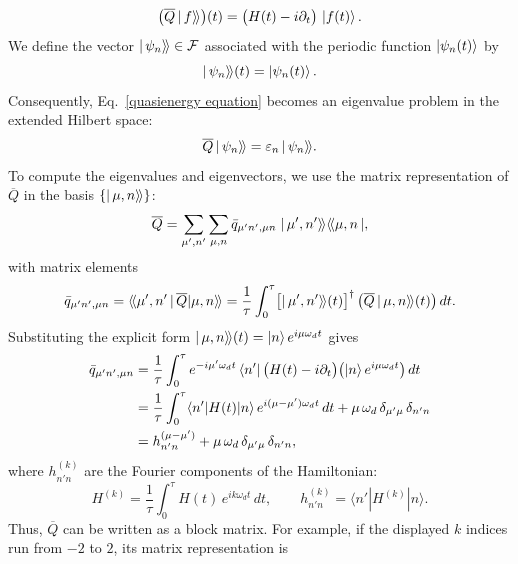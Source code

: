\begin{appendices}
\begin{equation}
    \bigl(\overline{Q}\,|\,f\rangle\!\rangle\bigr)(t) = \bigl(H(t)-i\partial_{t}\bigr)\,\ket{f(t)}.
\end{equation}
We define the vector $|\,\psi_n\rangle\!\rangle \in \mathcal{F}$ associated with the periodic function $\ket{\psi_n(t)}$ by
\begin{equation}
    \label{eigenvector definition}
    |\,\psi_n\rangle\!\rangle(t) = \ket{\psi_n(t)}.
\end{equation}
Consequently, Eq.~\eqref{quasienergy equation} becomes an eigenvalue problem in the extended Hilbert space:
\begin{equation}
    \label{evals equation}
    \overline{Q}\,|\,\psi_n\rangle\!\rangle = \varepsilon_n\,|\,\psi_n\rangle\!\rangle.
\end{equation}
To compute the eigenvalues and eigenvectors, we use the matrix representation of $\overline{Q}$ in the basis $\{|\,\mu,n\rangle\!\rangle\}$:
\begin{equation}
    \overline{Q} = \sum_{\mu',n'}\sum_{\mu,n} \bar{q}_{\mu' n',\mu n}\;|\,\mu',n'\rangle\!\rangle\langle\!\langle\mu,n\,|,
\end{equation}
with matrix elements
\begin{align}
    \bar{q}_{\mu' n',\mu n}
    = \langle\!\langle\mu',n'\,|\,\overline{Q}|\mu,n\rangle\!\rangle \nonumber= \frac{1}{\tau}\int_{0}^{\tau} \bigl[|\,\mu',n'\rangle\!\rangle(t)\bigr]^\dagger\, \bigl(\overline{Q}\,|\,\mu,n\rangle\!\rangle(t)\bigr)\,dt.
\end{align}
Substituting the explicit form $|\,\mu,n\rangle\!\rangle(t)=\ket{n}e^{i\mu\omega_d t}$ gives
\begin{align}
    \bar{q}_{\mu' n',\mu n}
    &= \frac{1}{\tau}\int_{0}^{\tau} e^{-i\mu'\omega_d t} \bra{n'} \bigl(H(t)-i\partial_t\bigr) \bigl(\ket{n}e^{i\mu\omega_d t}\bigr) \,dt \nonumber \\
    &= \frac{1}{\tau}\int_{0}^{\tau} \langle n'|H(t)|n\rangle\,e^{i(\mu-\mu')\omega_d t}\,dt
    + \mu\,\omega_d\,\delta_{\mu'\mu}\,\delta_{n'n} \nonumber \\
    &= h_{n' n}^{(\mu-\mu')} + \mu\,\omega_d\,\delta_{\mu'\mu}\,\delta_{n'n},
\end{align}
where $h_{n'n}^{(k)}$ are the Fourier components of the Hamiltonian:
\begin{equation}
    H^{(k)} = \frac{1}{\tau}\int_{0}^{\tau} H(t)\,e^{ik\omega_d t}\,dt, \qquad h^{(k)}_{n' n}=\langle n'|H^{(k)}|n\rangle.
\end{equation}
Thus, $\overline{Q}$ can be written as a block matrix. For example, if the displayed $k$ indices run from $-2$ to $2$, its matrix representation is

\end{appendices}
